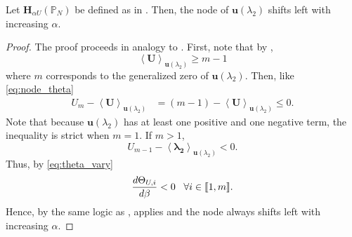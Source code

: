 \begin{thm}
	Let $\mathbf{H}_{\alpha U}(\mathbb{P}_N)$ be defined as in . Then, the node of $\mathbf{u}(\lambda_2)$ shifts left with increasing $\alpha$.
\end{thm}
\begin{proof}
	The proof proceeds in analogy to . First, note that by ,
	\begin{equation}
		\left\langle \mathbf{U} \right\rangle_{\mathbf{u}(\lambda_2)} \geq m-1
	\end{equation}
	where $m$ corresponds to the generalized zero of $\mathbf{u}(\lambda_2)$. Then, like \cref{eq:node_theta}
	\begin{align}
		U_{m} - \left\langle \mathbf{U} \right\rangle_{\mathbf{u}(\lambda_2)} &= (m-1) - \left\langle \mathbf{U} \right\rangle_{\mathbf{u}(\lambda_2)} \leq 0.
	\end{align}
	Note that because $\mathbf{u}(\lambda_2)$ has at least one positive and one negative term, the inequality is strict when $m=1$. If $m>1$,
	\begin{equation}
		U_{m-1} - \left\langle \mathbf{\lambda_2} \right\rangle_{\mathbf{u}(\lambda_2)} < 0.
	\end{equation}
	Thus, by \cref{eq:theta_vary}
	\begin{equation}
	  \frac{d \Theta_{U,i}}{d\beta} <0 \; \; \; \text{$\forall i \in \left \llbracket 1 , m \right \rrbracket$}.
	\end{equation}
	Hence, by the same logic as ,  applies and the node always shifts left with increasing $\alpha$.
\end{proof}

